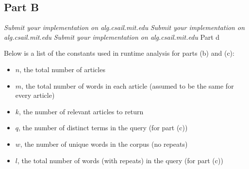\documentclass[12pt,twoside]{article}
\begin{document}
\begin{problems}
\section*{Part B}

\problem
\begin{problemparts}
\problempart \emph{Submit your implementation on alg.csail.mit.edu}
\problempart \emph{Submit your implementation on alg.csail.mit.edu}
\problempart \emph{Submit your implementation on alg.csail.mit.edu}
\problempart Part d %

Below is a list of the constants used in runtime analysis for parts (b) and (c):
\begin{itemize}
	\item $n$, the total number of articles
	\item $m$, the total number of words in each article (assumed to be the same for every article)
	\item $k$, the number of relevant articles to return
	\item $q$, the number of distinct terms in the query (for part (c))
	\item $w$, the number of unique words in the corpus (no repeats)
	\item $l$, the total number of words (with repeats) in the query (for part (c))
\end{itemize}


\newcommand{\functionb}{get-relevant-articles-tf-idf}
\newcommand{\functionc}{search}

\vspace{5mm}


\end{problemparts}
\end{problems}
\end{document}
